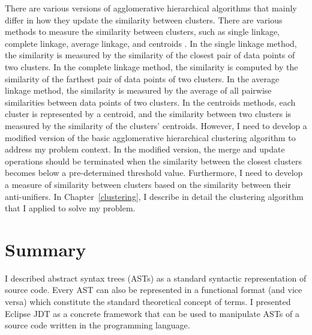 

There are various versions of agglomerative hierarchical algorithms that mainly differ in how they update the similarity between clusters. There are various methods to measure the similarity between clusters, such as single linkage, complete linkage, average linkage, and centroids \cite{Rasmussen:1992:CA:129687.129703}. In the single linkage method, the similarity is measured by the similarity of the closest pair of data points of two clusters. In the complete linkage method, the similarity is computed by the similarity of the farthest pair of data points of two clusters. In the average linkage method, the similarity is measured by the average of all pairwise similarities between data points of two clusters. In the centroids methods, each cluster is represented by a centroid, and the similarity between two clusters is measured by the similarity of the clusters' centroids. However, I need to develop a modified version of the basic agglomerative hierarchical clustering algorithm to address my problem context. In the modified version, the merge and update operations should be terminated when the similarity between the closest clusters becomes below a pre-determined threshold value. Furthermore, I need to develop a measure of similarity between clusters based on the similarity between their anti-unifiers. In Chapter~\ref{clustering}, I describe in detail the clustering algorithm that I applied to solve my problem.




\section{Summary}  \label{summary}
I described abstract syntax trees (ASTs) as a standard syntactic representation of source code. Every AST can also be represented in a functional format (and vice versa) which constitute the standard theoretical concept of terms. I presented Eclipse JDT as a concrete framework that can be used to manipulate ASTs of a source code written in the  programming language.


